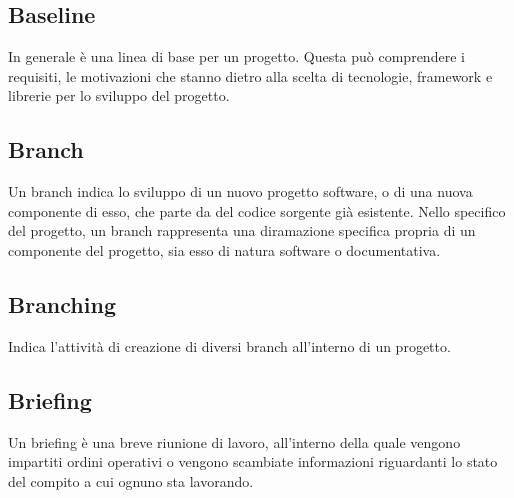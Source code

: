 
\subsection*{Baseline}
In generale è una linea di base per un progetto. Questa può comprendere i requisiti, le motivazioni che stanno dietro alla scelta di tecnologie, framework e librerie per lo sviluppo del progetto.

\subsection*{Branch}
Un branch indica lo sviluppo di un nuovo progetto software, o di una nuova componente di esso, che parte da del codice sorgente già esistente. Nello specifico del progetto, un branch rappresenta una diramazione specifica propria di un componente del progetto, sia esso di natura software o documentativa.

\subsection*{Branching}
Indica l'attività di creazione di diversi branch all'interno di un progetto.

\subsection*{Briefing}
Un briefing è una breve riunione di lavoro, all'interno della quale vengono impartiti ordini operativi o vengono scambiate informazioni riguardanti lo stato del compito a cui ognuno sta lavorando.

